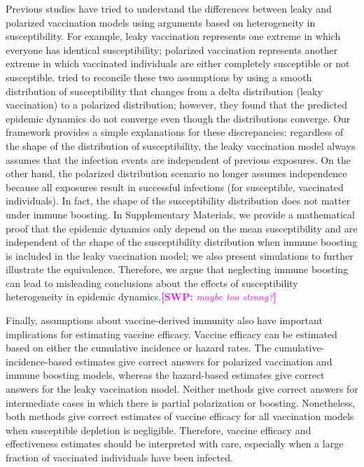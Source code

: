 \documentclass[12pt]{article}
\newcommand{\comment}{\showcomment}
\newcommand{\showcomment}[3]{\textcolor{#1}{\textbf{[#2: }\textsl{#3}\textbf{]}}}
\newcommand{\swp}[1]{\comment{magenta}{SWP}{#1}}
\begin{document}
Previous studies have tried to understand the differences between leaky and polarized vaccination models using arguments based on heterogeneity in susceptibility.
For example, leaky vaccination represents one extreme in which everyone has identical susceptibility;
polarized vaccination represents another extreme in which vaccinated individuals are either completely susceptible or not susceptible.
\cite{gomes2014missing} tried to reconcile these two assumptions by using a smooth distribution of susceptibility that changes from a delta distribution (leaky vaccination) to a polarized distribution;
however, they found that the predicted epidemic dynamics do not converge even though the distributions converge.
Our framework provides a simple explanations for these discrepancies:
regardless of the shape of the distribution of susceptibility, the leaky vaccination model always assumes that the infection events are independent of previous exposures.
On the other hand, the polarized distribution scenario no longer assumes independence because all exposures result in successful infections (for susceptible, vaccinated individuals).
In fact, the shape of the susceptibility distribution does not matter under immune boosting.
In Supplementary Materials, we provide a mathematical proof that the epidemic dynamics only depend on the mean susceptibility and are independent of the shape of the susceptibility distribution when immune boosting is included in the leaky vaccination model; we also present simulations to further illustrate the equivalence.
Therefore, we argue that neglecting immune boosting can lead to misleading conclusions about the effects of susceptibility heterogeneity in epidemic dynamics.\swp{maybe too strong?}

Finally, assumptions about vaccine-derived immunity also have important implications for estimating vaccine efficacy.
Vaccine efficacy can be estimated based on either the cumulative incidence or hazard rates.
The cumulative-incidence-based estimates give correct answers for polarized vaccination and immune boosting models,
whereas the hazard-based estimates give correct answers for the leaky vaccination model.
Neither methods give correct answers for intermediate cases in which there is partial polarization or boosting.
Nonetheless, both methods give correct estimates of vaccine efficacy for all vaccination models when susceptible depletion is negligible.
Therefore, vaccine efficacy and effectiveness estimates should be interpreted with care, especially when a large fraction of vaccinated individuals have been infected.
\end{document}
